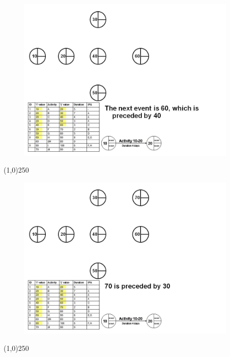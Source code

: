 \begin{frame}
\begin{figure}
	\centering
		\includegraphics[width = 10.5cm]{oldnotes/Slide86.jpg}
\end{figure}
\end{frame}
\begin{center}\line(1,0){250}\end{center}


\begin{frame}
\begin{figure}
	\centering
		\includegraphics[width = 10.5cm]{oldnotes/Slide87.jpg}
\end{figure}
\end{frame}
\begin{center}\line(1,0){250}\end{center}


